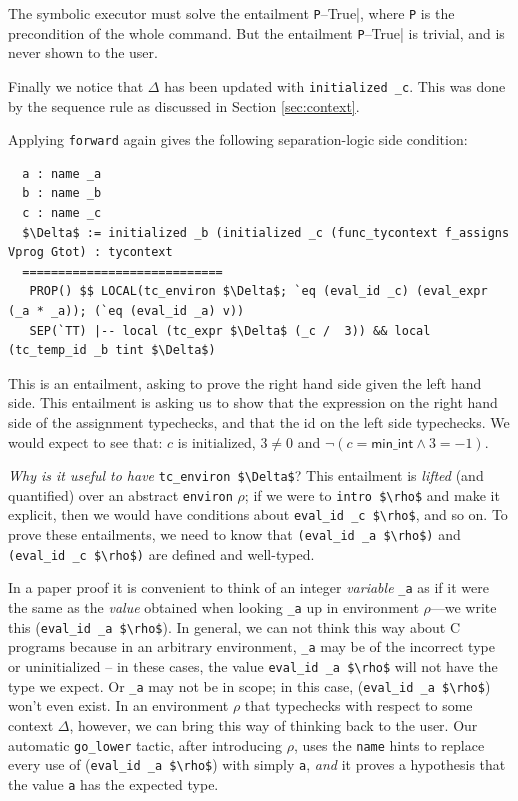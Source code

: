 \documentclass{puthesis}
\begin{document}
The symbolic executor must solve the entailment \lstinline|P|--True|,
where 
\lstinline|P| is the
precondition of the whole command.  But the entailment
\lstinline|P|--True| is trivial, and is never shown to the user.

Finally we notice that $\Delta$ has been updated with 
\lstinline|initialized _c|. This was done by the sequence rule as discussed in
Section \ref{sec:context}.

Applying \lstinline|forward| again gives 
the following separation-logic side condition: 

\begin{lstlisting}
  a : name _a
  b : name _b
  c : name _c
  $\Delta$ := initialized _b (initialized _c (func_tycontext f_assigns Vprog Gtot) : tycontext 
  ============================
   PROP() $$ LOCAL(tc_environ $\Delta$; `eq (eval_id _c) (eval_expr (_a * _a)); (`eq (eval_id _a) v)) 
   SEP(`TT) |-- local (tc_expr $\Delta$ (_c /  3)) && local (tc_temp_id _b tint $\Delta$)
\end{lstlisting}
\noindent This is an entailment, asking to prove the right hand side
given the left hand side. This entailment is asking us to show that
the expression on the right hand side of the assignment typechecks,
and that the id on the left side typechecks. We would expect to see
that: $c$ is initialized, $3\neq 0$ and $\neg(c=\mathsf{min\_int}
\wedge 3 = -1)$.

\emph{Why is it useful to have} \lstinline{tc_environ $\Delta$}?
This entailment is \emph{lifted} (and quantified) over an abstract
\lstinline|environ| $\rho$; if we were to \lstinline|intro $\rho$| and make it
explicit, then we would have conditions about \lstinline{eval_id _c $\rho$},
and so on.  
To prove these entailments, we need to know that
\lstinline{(eval_id _a $\rho$)}  and 
\lstinline{(eval_id _c $\rho$)}  are defined and well-typed.

In a paper proof it is convenient to think of an integer
\emph{variable} \lstinline{_a} as if it were the same as the
\emph{value} obtained when looking \lstinline{_a} up in environment
$\rho$---we write this (\lstinline|eval_id _a $\rho$|). In general, we
can not think this way about C programs because in an arbitrary
environment, \lstinline|_a| may be of the incorrect type or
uninitialized -- in these cases, the value 
\lstinline|eval_id _a $\rho$| will not have the type we expect.  Or \lstinline|_a| may not
be in scope; in this case, (\lstinline|eval_id _a $\rho$|) won't even exist. In
an environment $\rho$ that typechecks with respect to some context
$\Delta$, however, we can bring this way of thinking back to the user.
Our automatic \lstinline|go_lower| tactic, after introducing $\rho$,
uses the \lstinline{name} hints to replace every use of
(\lstinline|eval_id _a $\rho$|) with simply \lstinline{a}, \emph{and}
it proves a hypothesis that the value \lstinline|a| has the expected
type.  
\end{document}
